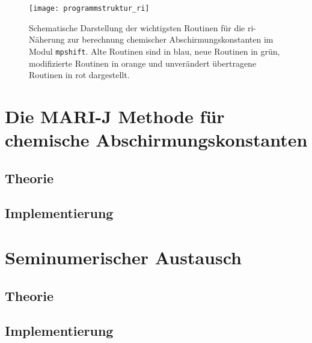 \begin{figure}[ht!]
\centering
\texttt{[image: programmstruktur\_ri]}
\captionsetup{figurewithin = chapter}
\captionsetup{font=small, labelfont=bf}\caption[RI-J Routinen für chemische Abschirmungskonstanten]{Schematische Darstellung der wichtigsten Routinen für die \ac{ri}-Näherung zur berechnung chemischer Abschirmungskonstanten im Modul \texttt{mpshift}. Alte Routinen sind in blau, neue Routinen in grün, modifizierte Routinen in orange und unverändert übertragene Routinen in rot dargestellt.}
\label{abb:programmstrukur_ri}
\end{figure}

\section{Die MARI-J Methode für chemische Abschirmungskonstanten}\label{marij}
	\subsection{Theorie}
	\subsection{Implementierung}

\section{Seminumerischer Austausch}
	\subsection{Theorie}
	\subsection{Implementierung}
	
